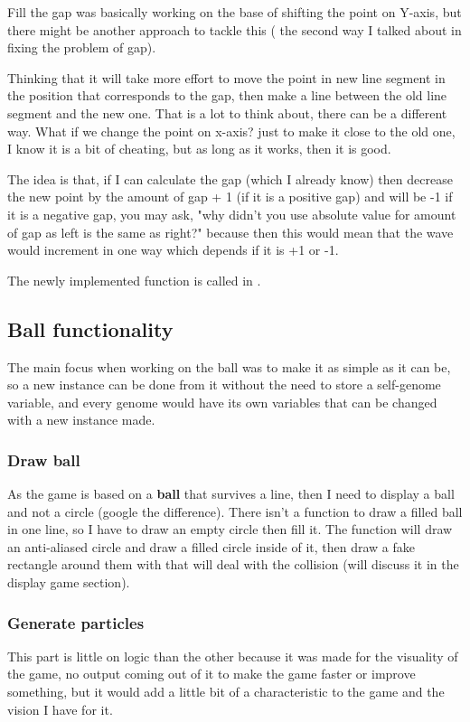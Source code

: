 Fill the gap was basically working on the base of shifting the point on Y-axis, but there might be another approach to tackle this ( the second way I talked about in fixing the problem of gap).

Thinking that it will take more effort to move the point in new line segment in the position that corresponds to the gap, then make a line between the old line segment and the new one. That is a lot to think about, there can be a different way. What if we change the point on x-axis? just to make it close to the old one, I know it is a bit of cheating, but as long as it works, then it is good.

The idea is that, if I can calculate the gap (which I already know) then decrease the new point by the amount of gap + 1 (if it is a positive gap) and will be -1 if it is a negative gap, you may ask, "why didn't you use absolute value for amount of gap as left is the same as right?" because then this would mean that the wave would increment in one way which depends if it is +1 or -1.

The newly implemented function is called  in .


\subsection{Ball functionality}\label{ball-functionality}
The main focus when working on the ball was to make it as simple as it can be, so a new instance can be done from it without the need to store a self-genome variable, and every genome would have its own variables that can be changed with a new instance made.

\subsubsection{Draw ball}\label{draw-ball}
As the game is based on a \textbf{ball} that survives a line, then I need to display a ball and not a circle (google the difference). There isn't a function to draw a filled ball in one line, so I have to draw an empty circle then fill it. The function  will draw an anti-aliased circle and  draw a filled circle inside of it, then draw a fake rectangle around them with  that will deal with the collision (will discuss it in the display game section).

\subsubsection{Generate particles}\label{generate-particles}
This part is little on logic than the other because it was made for the visuality of the game, no output coming out of it to make the game faster or improve something, but it would add a little bit of a characteristic to the game and the vision I have for it.

